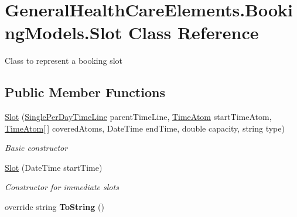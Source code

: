 \hypertarget{class_general_health_care_elements_1_1_booking_models_1_1_slot}{}\section{General\+Health\+Care\+Elements.\+Booking\+Models.\+Slot Class Reference}
\label{class_general_health_care_elements_1_1_booking_models_1_1_slot}


Class to represent a booking slot  


\subsection*{Public Member Functions}
\begin{DoxyCompactItemize}
\item 
\hyperlink{class_general_health_care_elements_1_1_booking_models_1_1_slot_a55a9a83bb0c4591b4cc8b2df23942472}{Slot} (\hyperlink{class_general_health_care_elements_1_1_booking_models_1_1_single_per_day_time_line}{Single\+Per\+Day\+Time\+Line} parent\+Time\+Line, \hyperlink{class_general_health_care_elements_1_1_booking_models_1_1_time_atom}{Time\+Atom} start\+Time\+Atom, \hyperlink{class_general_health_care_elements_1_1_booking_models_1_1_time_atom}{Time\+Atom}\mbox{[}$\,$\mbox{]} covered\+Atoms, Date\+Time end\+Time, double capacity, string type)
\begin{DoxyCompactList}\small\item\em Basic constructor \end{DoxyCompactList}\item 
\hyperlink{class_general_health_care_elements_1_1_booking_models_1_1_slot_a93812e912aa64aea7f5d4a8ac14d9720}{Slot} (Date\+Time start\+Time)
\begin{DoxyCompactList}\small\item\em Constructor for immediate slots \end{DoxyCompactList}\item 
override string {\bfseries To\+String} ()\hypertarget{class_general_health_care_elements_1_1_booking_models_1_1_slot_adf2a004209512149f3b58d1b0eb58d80}{}\label{class_general_health_care_elements_1_1_booking_models_1_1_slot_adf2a004209512149f3b58d1b0eb58d80}

\end{DoxyCompactItemize}
